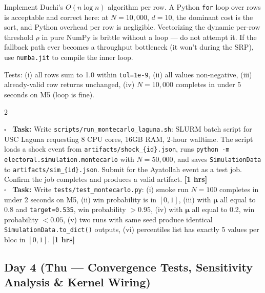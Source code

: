 \documentclass[11pt]{article}
\newcommand{\hrs}[1]{\textbf{[#1 hrs]}}
\newcommand{\boldmu}{\boldsymbol{\mu}}
\newcommand{\dayhead}[2]{%
  \subsection*{Day #1 \normalfont\small\color{codegray}(#2)}}
\newcommand{\task}[2]{%
  \noindent\textbf{Task:} #1 \hfill \hrs{#2}\\}
\newcommand{\done}{\textcolor{sectionblue}{$\square$}\ }
\begin{document}
\begin{taskbox}
{  Implement Duchi's $O(n \log n)$ algorithm per row. A Python \texttt{for}
  loop over rows is acceptable and correct here: at $N = 10{,}000$,
  $d = 10$, the dominant cost is the sort, and Python overhead per row is
  negligible. Vectorizing the dynamic per-row threshold $\rho$ in pure NumPy
  is brittle without a loop --- do not attempt it. If the fallback path
  ever becomes a throughput bottleneck (it won't during the SRP), use
  \texttt{numba.jit} to compile the inner loop.

  Tests: (i) all rows sum to 1.0 within \texttt{tol=1e-9}, (ii) all values
  non-negative, (iii) already-valid row returns unchanged,
  (iv) $N=10{,}000$ completes in under 5 seconds on M5 (loop is fine).}{2}

\done \task{Write \texttt{scripts/run\_montecarlo\_laguna.sh}: SLURM batch
  script for USC Laguna requesting 8 CPU cores, 16GB RAM, 2-hour walltime.
  The script loads a shock event from \texttt{artifacts/shock\_\{id\}.json},
  runs \texttt{python -m electoral.simulation.montecarlo} with $N=50{,}000$,
  and saves \texttt{SimulationData} to \texttt{artifacts/sim\_\{id\}.json}.
  Submit for the Ayatollah event as a test job. Confirm the job
  completes and produces a valid artifact.}{1}

\done \task{Write \texttt{tests/test\_montecarlo.py}: (i) smoke run $N=100$
  completes in under 2 seconds on M5, (ii) win probability is in $[0,1]$,
  (iii) with $\boldmu$ all equal to 0.8 and \texttt{target=0.535}, win
  probability $> 0.95$, (iv) with $\boldmu$ all equal to 0.2, win
  probability $< 0.05$, (v) two runs with same seed produce identical
  \texttt{SimulationData.to\_dict()} outputs, (vi) percentiles list has
  exactly 5 values per bloc in $[0,1]$.}{1}
\end{taskbox}

\dayhead{4}{Thu --- Convergence Tests, Sensitivity Analysis \& Kernel Wiring}
\end{document}
